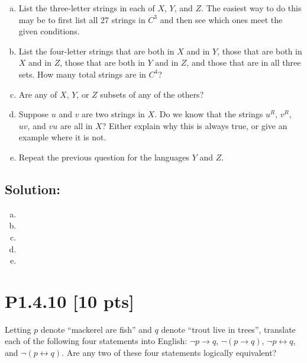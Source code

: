 \documentclass[12pt]{article}
\begin{document}
\begin{enumerate}[(a)]
    \item List the three-letter strings in each of $X$, $Y$, and $Z$. The easiest way to do this may be to first list all 27 strings in $C^3$ and then see which ones meet the given conditions.

    \item List the four-letter strings that are both in $X$ and in $Y$, those that are both in $X$ and in $Z$, those that are both in $Y$ and in $Z$, and those that are in all three sets. How many total strings are in $C^4$?

    \item Are any of $X$, $Y$, or $Z$ subsets of any of the others?

    \item Suppose $u$ and $v$ are two strings in $X$. Do we know that the strings $u^R$, $v^R$, $uv$, and $vu$ are all in $X$? Either explain why this is always true, or give an example where it is not.

    \item Repeat the previous question for the languages $Y$ and $Z$.

\end{enumerate}
\subsection*{\textbf{Solution:}}
\begin{enumerate}[(a)]
    \item 

    \item 

    \item 

    \item 

    \item 
    
\end{enumerate}


\newpage
\section*{\textbf{P1.4.10} [10 pts]}
Letting $p$ denote “mackerel are fish” and $q$ denote “trout live in trees”, translate each of the following four statements into English: $\neg p \rightarrow q$, $\neg (p \rightarrow q)$, $\neg p \leftrightarrow q$, and $\neg(p \leftrightarrow q)$. Are any two of these four statements logically equivalent?
\end{document}
